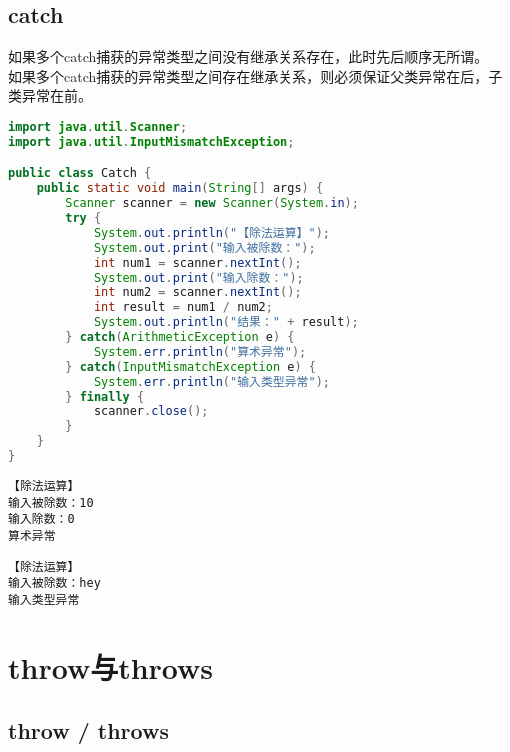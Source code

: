 \vspace{0.5cm}

\subsection{catch}

如果多个catch捕获的异常类型之间没有继承关系存在，此时先后顺序无所谓。\\

如果多个catch捕获的异常类型之间存在继承关系，则必须保证父类异常在后，子类异常在前。\\


\begin{lstlisting}[language=Java]
import java.util.Scanner;
import java.util.InputMismatchException;

public class Catch {
    public static void main(String[] args) {
        Scanner scanner = new Scanner(System.in);
        try {
            System.out.println("【除法运算】");
            System.out.print("输入被除数：");
            int num1 = scanner.nextInt();
            System.out.print("输入除数：");
            int num2 = scanner.nextInt();
            int result = num1 / num2;
            System.out.println("结果：" + result);
        } catch(ArithmeticException e) {
            System.err.println("算术异常");
        } catch(InputMismatchException e) {
            System.err.println("输入类型异常");
        } finally {
            scanner.close();
        }
    }
}
\end{lstlisting}

\begin{tcolorbox}
    \begin{verbatim}
【除法运算】
输入被除数：10
输入除数：0
算术异常
	\end{verbatim}

    \begin{verbatim}
【除法运算】
输入被除数：hey
输入类型异常
	\end{verbatim}
\end{tcolorbox}

\newpage

\section{throw与throws}

\subsection{throw / throws}

